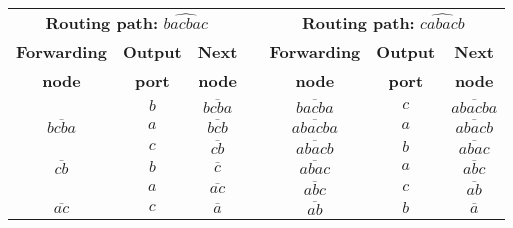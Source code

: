 \small
\begin{tabular}[b]{|c| c |c |c|c|c|c|}
\multicolumn{3}{c}{\multirow{2}{*}{\textbf{Routing path:} $\widehat{bacbac}$}}&\multicolumn{1}{c}{}&\multicolumn{3}{c}{\multirow{2}{*}{\textbf{Routing path:} $\widehat{cabacb}$}}\\
\multicolumn{7}{c}{}\\
\cline{1-3}\cline{5-7}
\rowcolor{gray!30}\textbf{{Forwarding}}&\textbf{{Output}}&\textbf{{Next}}&\multicolumn{1}{c|}{\cellcolor{white}}&\textbf{{Forwarding}}&\textbf{{Output}}&\textbf{{Next}}\\
\rowcolor{gray!30}\textbf{{node}}&\textbf{{port}}&\textbf{{node}}&\multicolumn{1}{c|}{\cellcolor{white}}&\textbf{{node}}&\textbf{{port}}&\textbf{{node}}\\
\cline{1-3}\cline{5-7}
\cline{1-3}\cline{5-7}
  \rowcolor{gray!10}\multirow{1}{*}{$\overline{bacba}$}& \multirow{1}{*}{$b$}&\multirow{1}{*}{$\overline{bcba}$}&\multicolumn{1}{c|}{\cellcolor{white}}&\multirow{1}{*}{$\overline{bacba}$}& \multirow{1}{*}{$c$}&\multirow{1}{*}{$\overline{abacba}$} \\ 
 \multirow{1}{*}{$\overline{bcba}$}& \multirow{1}{*}{$a$}&\multirow{1}{*}{$\overline{bcb}$} &\multicolumn{1}{c|}{} & \multirow{1}{*}{$\overline{abacba}$}& \multirow{1}{*}{$a$}&\multirow{1}{*}{$\overline{abacb}$}\\ 
\rowcolor{gray!10}
\multirow{1}{*}{$\overline{bcb}$}& \multirow{1}{*}{$c$}&\multirow{1}{*}{$\overline{cb}$}&\multicolumn{1}{c|}{\cellcolor{white}}&\multirow{1}{*}{$\overline{abacb}$}& \multirow{1}{*}{$b$}&\multirow{1}{*}{$\overline{abac}$} \\ 
\multirow{1}{*}{$\overline{cb}$}& \multirow{1}{*}{$b$}&\multirow{1}{*}{$\overline{c}$}&\multicolumn{1}{c|}{} &\multirow{1}{*}{$\overline{abac}$}& \multirow{1}{*}{$a$}&\multirow{1}{*}{$\overline{abc}$} \\  
\rowcolor{gray!10}\multirow{1}{*}{$\overline{c}$}& \multirow{1}{*}{$a$}&\multirow{1}{*}{$\overline{ac}$} &\multicolumn{1}{c|}{\cellcolor{white}}&\multirow{1}{*}{$\overline{abc}$}& \multirow{1}{*}{$c$}&\multirow{1}{*}{$\overline{ab}$}\\ 
\multirow{1}{*}{$\overline{ac}$}& \multirow{1}{*}{$c$}&\multirow{1}{*}{$\overline{a}$}&\multicolumn{1}{c|}{}&\multirow{1}{*}{$\overline{ab}$}& \multirow{1}{*}{$b$}&\multirow{1}{*}{$\overline{a}$} \\
\cline{1-3}\cline{5-7}
\end{tabular}